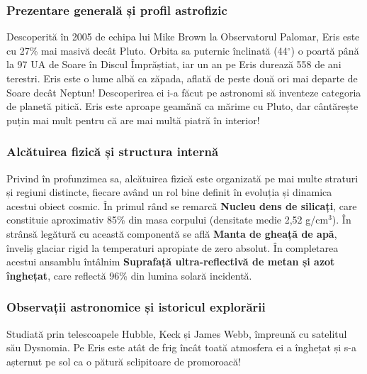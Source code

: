 \subsubsection*{Prezentare generală și profil astrofizic}
Descoperită în 2005 de echipa lui Mike Brown la Observatorul Palomar, Eris este cu 27\% mai masivă decât Pluto. Orbita sa puternic înclinată (44$^\circ$) o poartă până la 97 UA de Soare în Discul Împrăștiat, iar un an pe Eris durează 558 de ani terestri. Eris este o lume albă ca zăpada, aflată de peste două ori mai departe de Soare decât Neptun! Descoperirea ei i-a făcut pe astronomi să inventeze categoria de \guillemotleft{}planetă pitică\guillemotright{}. Eris este aproape geamănă ca mărime cu Pluto, dar cântărește puțin mai mult pentru că are mai multă piatră în interior!

\subsubsection*{Alcătuirea fizică și structura internă}
Privind în profunzimea sa, alcătuirea fizică este organizată pe mai multe straturi și regiuni distincte, fiecare având un rol bine definit în evoluția și dinamica acestui obiect cosmic. În primul rând se remarcă \textbf{Nucleu dens de silicați}, care constituie aproximativ 85\% din masa corpului (densitate medie 2,52 g/cm$^3$). În strânsă legătură cu această componentă se află \textbf{Manta de gheață de apă}, înveliș glaciar rigid la temperaturi apropiate de zero absolut. În completarea acestui ansamblu întâlnim \textbf{Suprafață ultra-reflectivă de metan și azot înghețat}, care reflectă 96\% din lumina solară incidentă.

\subsubsection*{Observații astronomice și istoricul explorării}
Studiată prin telescoapele Hubble, Keck și James Webb, împreună cu satelitul său Dysnomia. Pe Eris este atât de frig încât toată atmosfera ei a înghețat și s-a așternut pe sol ca o pătură sclipitoare de promoroacă!


